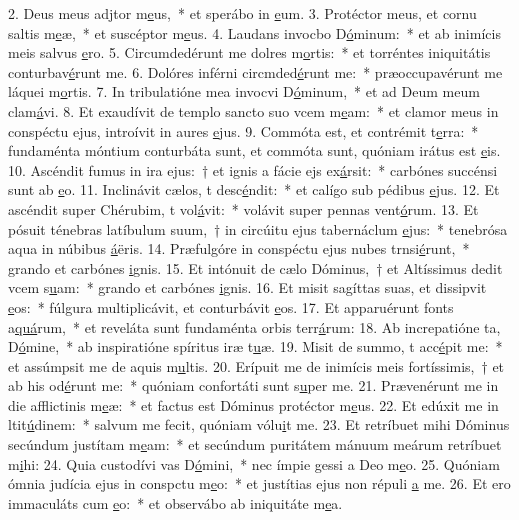 2. Deus meus adjtor m\uline{e}us,~* et sperábo in \uline{e}um.
3. Protéctor meus, et cornu saltis m\uline{e}æ,~* et suscéptor m\uline{e}us.
4. Laudans invocbo D\uline{ó}minum:~* et ab inimícis meis salvus \uline{e}ro.
5. Circumdedérunt me dolres m\uline{o}rtis:~* et torréntes iniquitátis conturbav\uline{é}runt me.
6. Dolóres inférni circmded\uline{é}runt me:~* præoccupavérunt me láquei m\uline{o}rtis.
7. In tribulatióne mea invocvi D\uline{ó}minum,~* et ad Deum meum clam\uline{á}vi.
8. Et exaudívit de templo sancto suo vcem m\uline{e}am:~* et clamor meus in conspéctu ejus, introívit in aures \uline{e}jus.
9. Commóta est, et contrémit t\uline{e}rra:~* fundaménta móntium conturbáta sunt, et commóta sunt, quóniam irátus est \uline{e}is.
10. Ascéndit fumus in ira ejus:~† et ignis a fácie ejs ex\uline{á}rsit:~* carbónes succénsi sunt ab \uline{e}o.
11. Inclinávit cælos, t desc\uline{é}ndit:~* et calígo sub pédibus \uline{e}jus.
12. Et ascéndit super Chérubim, t vol\uline{á}vit:~* volávit super pennas vent\uline{ó}rum.
13. Et pósuit ténebras latíbulum suum,~† in circúitu ejus tabernáclum \uline{e}jus:~* tenebrósa aqua in núbibus \uline{á}ëris.
14. Præfulgóre in conspéctu ejus nubes trnsi\uline{é}runt,~* grando et carbónes \uline{i}gnis.
15. Et intónuit de cælo Dóminus,~† et Altíssimus dedit vcem s\uline{u}am:~* grando et carbónes \uline{i}gnis.
16. Et misit sagíttas suas, et dissipvit \uline{e}os:~* fúlgura multiplicávit, et conturbávit \uline{e}os.
17. Et apparuérunt fonts a\uline{quá}rum,~* et reveláta sunt fundaménta orbis terr\uline{á}rum:
18. Ab increpatióne ta, D\uline{ó}mine,~* ab inspiratióne spíritus iræ t\uline{u}æ.
19. Misit de summo, t acc\uline{é}pit me:~* et assúmpsit me de aquis m\uline{u}ltis.
20. Erípuit me de inimícis meis fortíssimis,~† et ab his  od\uline{é}runt me:~* quóniam confortáti sunt s\uline{u}per me.
21. Prævenérunt me in die afflictinis m\uline{e}æ:~* et factus est Dóminus protéctor m\uline{e}us.
22. Et edúxit me in ltit\uline{ú}dinem:~* salvum me fecit, quóniam vólu\uline{i}t me.
23. Et retríbuet mihi Dóminus secúndum justítam m\uline{e}am:~* et secúndum puritátem mánuum meárum retríbuet m\uline{i}hi:
24. Quia custodívi vas D\uline{ó}mini,~* nec ímpie gessi a Deo m\uline{e}o.
25. Quóniam ómnia judícia ejus in conspctu m\uline{e}o:~* et justítias ejus non répuli \uline{a} me.
26. Et ero immaculáts cum \uline{e}o:~* et observábo ab iniquitáte m\uline{e}a.
